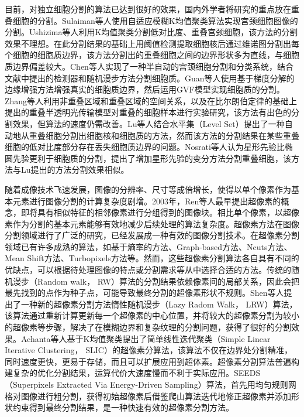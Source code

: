 \documentclass[nomlist,masters]{seuthesix}
\begin{document}
目前，对独立细胞分割的算法已达到很好的效果，国内外学者将研究的重点放在重叠细胞的分割。Sulaiman等人使用自适应模糊K均值聚类算法实现宫颈细胞图像的分割\cite{Sulaiman2015Improvement,Sulaiman2010Adaptive}。Ushizima等人\cite{Ushizima2013Automated}利用K均值聚类分割低对比度、重叠宫颈细胞，该方法的分割效果不理想。在此分割结果的基础上用阈值检测提取细胞核后通过维诺图分割出每个细胞的细胞质边界，该方法分割出的重叠细胞之间的边界形状多为直线，与细胞质边界偏差较大\cite{Ushizima2015SEGMENTATION}。Chen等人\cite{Chen2014Semi}实现了一种半自动的宫颈细胞分割和分类系统，结合文献中提出的检测器和随机漫步方法分割细胞质。Guan等人\cite{Guan2015Accurate}使用基于梯度分解的边缘增强方法增强真实的细胞质边界，然后运用GVF模型实现细胞质的分割。Zhang等人\cite{Zhang2016Segmentation}利用非重叠区域和重叠区域的空间关系，以及在比尔朗伯定律的基础上提出的重叠半透明光传输模型对重叠的细胞样本进行实验研究，该方法有出色的分割效果，但算法的速度仍需改善。Lu等人结合水平集（Level Set）提出了一种自动地从重叠细胞分割出细胞核和细胞质的方法\cite{Lu2013Automated}，然而该方法的分割结果在某些重叠细胞的低对比度部分存在丢失细胞质边界的问题。Nosrati等人\cite{Nosrati2014A,Nosrati2015Segmentation}认为星形先验比椭圆先验更利于细胞质的分割，提出了增加星形先验的变分方法分割重叠细胞，该方法与Lu提出的方法分割效果相似。

随着成像技术飞速发展，图像的分辨率、尺寸等成倍增长，使得以单个像素作为基本元素进行图像分割的计算复杂度剧增。2003年，Ren等人\cite{Ren2003Learning}最早提出超像素的概念，即将具有相似特征的相邻像素进行分组得到的图像块。相比单个像素，以超像素作为分割的基本元素能够有效地减少后续处理的算法复杂度。超像素方法在图像分割领域进行了广泛的研究，已经发展成一种有效的图像分割技术。在超像素分割领域已有许多成熟的算法，如基于熵率的方法\cite{Liu2011Entropy}、Graph-based方法\cite{Felzenszwalb2004Efficient}、Ncuts方法\cite{Member2002Normalized}、Mean Shift方法\cite{Comaniciu2002Mean}、Turbopixels方法\cite{Levinshtein2009TurboPixels,王春瑶2014超像素分割算法研究综述,张晓平2015几种新超像素算法的研究}等。然而，这些超像素分割算法各自具有不同的优缺点，可以根据待处理图像的特点或分割需求等从中选择合适的方法。传统的随机漫步（Random walk， RW）算法\cite{Grady2006Random}的分割结果依赖像素间的局部关系，因此会把最先找到的点作为种子点，可能导致最终分割的超像素形状不规则。Shen等人提出了一种新的超像素分割方法惰性随机漫步（Lazy Radom Walk， LRW）算法\cite{Shen2014Lazy}，该算法通过重新计算更新每一个超像素的中心位置，并将较大的超像素分割为较小的超像素等步骤，解决了在模糊边界和复杂纹理的分割问题，获得了很好的分割效果。Achanta等人基于K均值聚类提出了简单线性迭代聚类（Simple Linear Iterative Clustering， SLIC）的超像素分算法\cite{Achanta2012SLIC,Liu2016Manifold}，该算法不仅在边界处分割精准，同时速度更快，更易于存储，而且可以扩展应用到超体素。超像素分割算法普遍构建复杂的优化分割结果，运算代价大速度慢而不利于实际应用。SEEDS（Superpixels Extracted Via Energy-Driven Sampling）算法\cite{Bergh2012SEEDS}，首先用均匀规则网格对图像进行粗分割，获得初始超像素后借鉴爬山算法迭代地修正超像素并添加形状约束得到最终分割结果，是一种快速有效的超像素分割方法。
\end{document}
